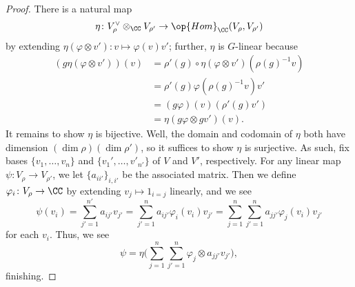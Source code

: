 \documentclass[../main.tex]{subfiles}
\begin{document}
\begin{proof}
	There is a natural map
	\[\eta\colon V_\rho^\lor\otimes_\CC V_{\rho'}\to\op{Hom}_\CC(V_\rho,V_{\rho'})\]
	by extending $\eta(\varphi\otimes v')\colon v\mapsto\varphi(v)v'$; further, $\eta$ is $G$-linear because
	\begin{align*}
		(g\eta(\varphi\otimes v'))(v) &= \rho'(g)\circ\eta(\varphi\otimes v')\left(\rho(g)^{-1}v\right) \\
		&= \rho'(g)\varphi\left(\rho(g)^{-1}v\right)v' \\
		&= (g\varphi)(v)(\rho'(g)v') \\
		&= \eta(g\varphi\otimes gv')(v).
	\end{align*}
	It remains to show $\eta$ is bijective. Well, the domain and codomain of $\eta$ both have dimension $(\dim\rho)(\dim\rho')$, so it suffices to show $\eta$ is surjective. As such, fix bases $\{v_1,\ldots,v_n\}$ and $\{v_1',\ldots,v'_{n'}\}$ of $V$ and $V'$, respectively. For any linear map $\psi\colon V_\rho\to V_{\rho'}$, we let $\{a_{ii'}\}_{i,i'}$ be the associated matrix. Then we define $\varphi_{i}\colon V_\rho\to\CC$ by extending $v_j\mapsto1_{i=j}$ linearly, and we see
	\[\psi(v_i)=\sum_{j'=1}^{n'}a_{ij'}v_{j'}=\sum_{j'=1}^na_{ij'}\varphi_{i}(v_i)v_{j'}=\sum_{j=1}^n\sum_{j'=1}^na_{jj'}\varphi_{j}(v_i)v_{j'}\]
	for each $v_i$. Thus, we see
	\[\psi=\eta\Bigg(\sum_{j=1}^n\sum_{j'=1}^n\varphi_{j}\otimes a_{jj'}v_{j'}\Bigg),\]
	finishing.
\end{proof}
\end{document}
